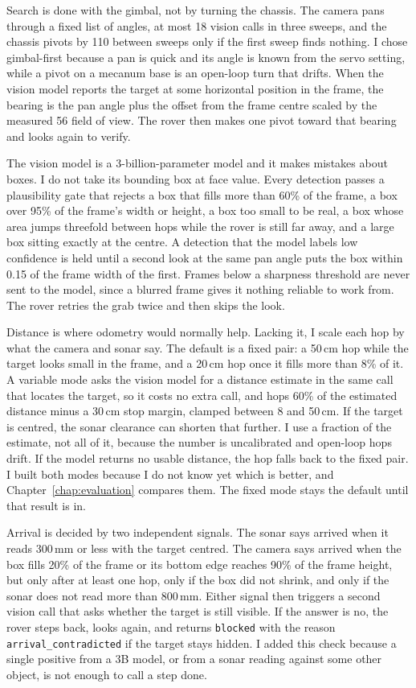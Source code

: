 Search is done with the gimbal, not by turning the chassis. The camera pans
through a fixed list of angles, at most 18 vision calls in three sweeps, and the
chassis pivots by 110\textdegree{} between sweeps only if the first sweep finds
nothing. I chose gimbal-first because a pan is quick and its angle is known from
the servo setting, while a pivot on a mecanum base is an open-loop turn that
drifts. When the vision model reports the target at some horizontal position in
the frame, the bearing is the pan angle plus the offset from the frame centre
scaled by the measured 56\textdegree{} field of view. The rover then makes one
pivot toward that bearing and looks again to verify.

The vision model is a 3-billion-parameter model and it makes mistakes about
boxes. I do not take its bounding box at face value. Every detection passes a
plausibility gate that rejects a box that fills more than 60\% of the frame, a box
over 95\% of the frame's width or height, a box too small to be real, a box whose
area jumps threefold between hops while the rover is still far away, and a large
box sitting exactly at the centre. A detection that the model labels low
confidence is held until a second look at the same pan angle puts the box within
0.15 of the frame width of the first. Frames below a sharpness threshold are
never sent to the model, since a blurred frame gives it nothing reliable to
work from. The rover retries the grab twice and then skips the look.

Distance is where odometry would normally help. Lacking it, I scale each hop by
what the camera and sonar say. The default is a fixed pair: a 50\,cm hop while the
target looks small in the frame, and a 20\,cm hop once it fills more than 8\% of
it. A variable mode asks the vision model for a distance estimate in the same
call that locates the target, so it costs no extra call, and hops 60\% of the
estimated distance minus a 30\,cm stop margin, clamped between 8 and 50\,cm. If
the target is centred, the sonar clearance can shorten that further. I use a
fraction of the estimate, not all of it, because the number is uncalibrated and
open-loop hops drift. If the model returns no usable distance, the hop falls back
to the fixed pair. I built both modes because I do not know yet which is better,
and Chapter~\ref{chap:evaluation} compares them. The fixed mode stays the default
until that result is in.

Arrival is decided by two independent signals. The sonar says arrived when it
reads 300\,mm or less with the target centred. The camera says arrived when the
box fills 20\% of the frame or its bottom edge reaches 90\% of the frame height,
but only after at least one hop, only if the box did not shrink, and only if the
sonar does not read more than 800\,mm. Either signal then triggers a second vision
call that asks whether the target is still visible. If the answer is no, the rover
steps back, looks again, and returns \texttt{blocked} with the reason
\texttt{arrival\_contradicted} if the target stays hidden. I added this check
because a single positive from a 3B model, or from a sonar reading against some
other object, is not enough to call a step done.

